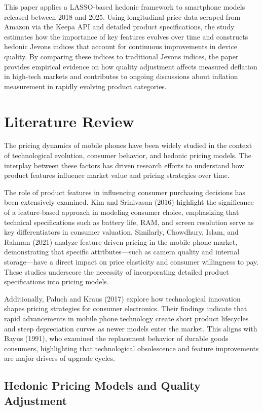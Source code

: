 \documentclass[12pt]{article}
\begin{document}
This paper applies a LASSO-based hedonic framework to smartphone models released between 2018 and 2025. Using longitudinal price data scraped from Amazon via the Keepa API and detailed product specifications, the study estimates how the importance of key features evolves over time and constructs hedonic Jevons indices that account for continuous improvements in device quality. By comparing these indices to traditional Jevons indices, the paper provides empirical evidence on how quality adjustment affects measured deflation in high-tech markets and contributes to ongoing discussions about inflation measurement in rapidly evolving product categories.


\section{Literature Review}

The pricing dynamics of mobile phones have been widely studied in the context of technological evolution, consumer behavior, and hedonic pricing models. The interplay between these factors has driven research efforts to understand how product features influence market value and pricing strategies over time.

The role of product features in influencing consumer purchasing decisions has been extensively examined. Kim and Srinivasan (2016) highlight the significance of a feature-based approach in modeling consumer choice, emphasizing that technical specifications such as battery life, RAM, and screen resolution serve as key differentiators in consumer valuation. Similarly, Chowdhury, Islam, and Rahman (2021) analyze feature-driven pricing in the mobile phone market, demonstrating that specific attributes—such as camera quality and internal storage—have a direct impact on price elasticity and consumer willingness to pay. These studies underscore the necessity of incorporating detailed product specifications into pricing models.

Additionally, Paluch and Kraus (2017) explore how technological innovation shapes pricing strategies for consumer electronics. Their findings indicate that rapid advancements in mobile phone technology create short product lifecycles and steep depreciation curves as newer models enter the market. This aligns with Bayus (1991), who examined the replacement behavior of durable goods consumers, highlighting that technological obsolescence and feature improvements are major drivers of upgrade cycles.

\subsection*{Hedonic Pricing Models and Quality Adjustment}
\end{document}
